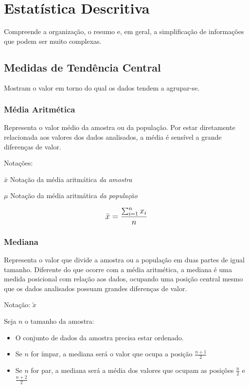 \chapter{Estatística Descritiva}

Compreende a organização, o resumo e, em geral, a simplificação de informações que podem ser muito complexas.

\section{Medidas de Tendência Central}

Mostram o valor em torno do qual os dados tendem a agrupar-se.

\subsection{Média Aritmética}

Representa o valor médio da amostra ou da população. Por estar diretamente relacionada aos valores dos dados analisados, a média é sensível a grande diferenças de valor. 

Notações:

\(\bar{x}\) Notação da média aritmática \emph{da amostra}

\(\mu\) Notação da média aritmática \emph{da população}

\[\beq{ \bar{x} = \frac{\sum_{i=1}^{n} x_i}{n} }\] 

\subsection{Mediana}

Representa o valor que divide a amostra ou a população em duas partes de igual tamanho. Diferente do que ocorre com a média aritmética, a mediana é uma medida posicional com relação aos dados, ocupando uma posição central mesmo que os dados analisados possuam grandes diferenças de valor.

Notação: \(\tilde{x}\)

Seja \(n\) o tamanho da amostra:
\begin{itemize}
	\item O conjunto de dados da amostra precisa estar ordenado.
	\item Se \(n\) for ímpar, a mediana será o valor que ocupa a posição \(\frac{n + 1}{2}\)
	\item Se \(n\) for par, a mediana será a média dos valores que ocupam as posições \(\frac{n}{2}\) e \(\frac{n + 2}{2}\)
\end{itemize}

